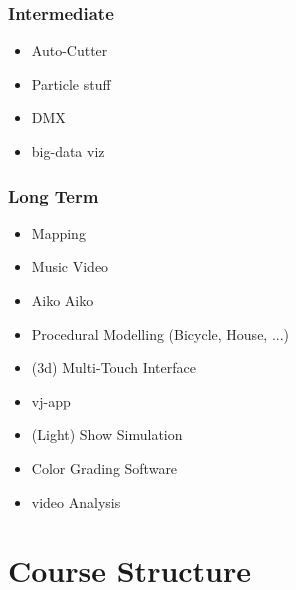 \subsubsection{Intermediate}
\begin{itemize}
	\item \glqq{}Auto-Cutter\grqq{}
	\item Particle stuff
	\item DMX
	\item big-data viz
\end{itemize}

\subsubsection{Long Term}
\begin{itemize}
	\item Mapping
	\item Music Video
	\item Aiko Aiko
	\item Procedural Modelling (Bicycle, House, ...)
	\item (3d) Multi-Touch Interface
	\item vj-app
	\item (Light) Show Simulation
	\item Color Grading Software
	\item video Analysis


\end{itemize}

\section{Course Structure} %




